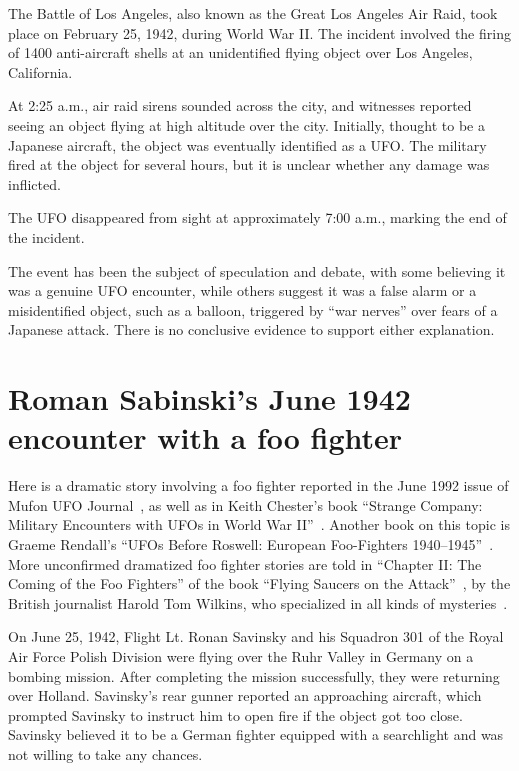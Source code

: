 The Battle of Los Angeles, also known as the Great Los Angeles Air Raid, took place on February 25, 1942, during World War II. The incident involved the firing of 1400 anti-aircraft shells at an unidentified flying object over Los Angeles, California.

At 2:25 a.m., air raid sirens sounded across the city, and witnesses reported seeing an object flying at high altitude over the city. Initially, thought to be a Japanese aircraft, the object was eventually identified as a UFO. The military fired at the object for several hours, but it is unclear whether any damage was inflicted.

The UFO disappeared from sight at approximately 7:00 a.m., marking the end of the incident.

The event has been the subject of speculation and debate, with some believing it was a genuine UFO encounter, while others suggest it was a false alarm or a misidentified object, such as a balloon, triggered by ``war nerves'' over fears of a Japanese attack. There is no conclusive evidence to support either explanation.




\section{Roman Sabinski's June 1942 encounter with a foo fighter}
\label{2023-UFO-part-History-chapter-pre-1945-RS42}

Here is a dramatic story involving a foo fighter reported in the June 1992 issue of Mufon UFO Journal~\cite{MUFONUFOJ-290},
as well as in Keith Chester's book ``Strange Company: {M}ilitary {E}ncounters with {UFO}s in {W}orld {W}ar {II}''~\cite{Chester2007May}.
Another book on this topic is Graeme Rendall's ``{UFO}s Before {R}oswell: {E}uropean {F}oo-{F}ighters 1940--1945''~\cite{Rendall2021Aug}.
More unconfirmed dramatized foo fighter stories are told
in ``Chapter II: The Coming of the Foo Fighters'' of the book ``Flying Saucers on the Attack''~\cite{Wilkins1954Jan},
by the British journalist Harold Tom Wilkins, who specialized in all kinds of mysteries~\cite{Wilkins1946,Wilkins2017Aug}.


On June 25, 1942, Flight Lt. Ronan Savinsky and his Squadron 301 of the Royal Air Force Polish Division were flying over the
Ruhr Valley in Germany on a bombing mission.
After completing the mission successfully, they were returning over Holland.
Savinsky's rear gunner reported an approaching aircraft, which prompted Savinsky to instruct him to open fire
if the object got too close. Savinsky believed it to be a German fighter equipped with a searchlight
and was not willing to take any chances.

